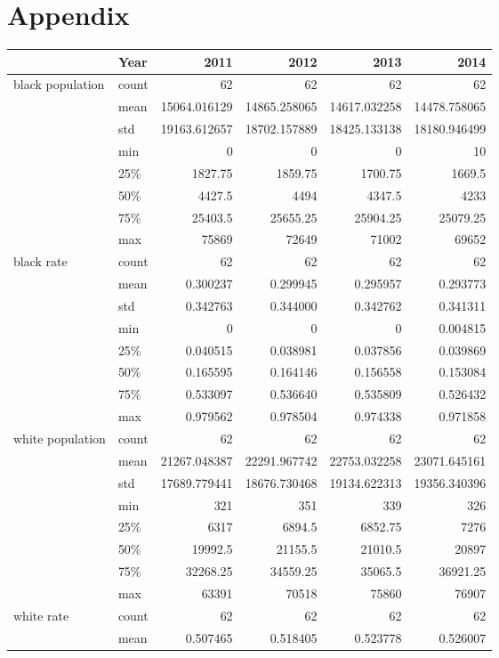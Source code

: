 \documentclass{article}
\begin{document}
\section{Appendix}
\begin{tabular}{llrrrr}
\toprule
           & Year &         2011 &         2012 &         2013 &         2014 \\
\midrule
 black population & count &      62 &      62 &      62 &      62 \\           & mean &   15064.016129 &   14865.258065 &   14617.032258 &   14478.758065 \\           & std &   19163.612657 &   18702.157889 &   18425.133138 &   18180.946499 \\           & min &       0 &       0 &       0 &      10 \\           & 25\% &    1827.75 &    1859.75 &    1700.75 &    1669.5 \\           & 50\% &    4427.5 &    4494 &    4347.5 &    4233 \\           & 75\% &   25403.5 &   25655.25 &   25904.25 &   25079.25 \\           & max &   75869 &   72649 &   71002 &   69652 \\black rate & count &      62 &      62 &      62 &      62 \\           & mean &       0.300237 &       0.299945 &       0.295957 &       0.293773 \\           & std &       0.342763 &       0.344000 &       0.342762 &       0.341311 \\           & min &       0 &       0 &       0 &       0.004815 \\           & 25\% &       0.040515 &       0.038981 &       0.037856 &       0.039869 \\           & 50\% &       0.165595 &       0.164146 &       0.156558 &       0.153084 \\           & 75\% &       0.533097 &       0.536640 &       0.535809 &       0.526432 \\           & max &       0.979562 &       0.978504 &       0.974338 &       0.971858 \\white population & count &      62 &      62 &      62 &      62 \\           & mean &   21267.048387 &   22291.967742 &   22753.032258 &   23071.645161 \\           & std &   17689.779441 &   18676.730468 &   19134.622313 &   19356.340396 \\           & min &     321 &     351 &     339 &     326 \\           & 25\% &    6317 &    6894.5 &    6852.75 &    7276 \\           & 50\% &   19992.5 &   21155.5 &   21010.5 &   20897 \\           & 75\% &   32268.25 &   34559.25 &   35065.5 &   36921.25 \\           & max &   63391 &   70518 &   75860 &   76907 \\white rate & count &      62 &      62 &      62 &      62 \\           & mean &       0.507465 &       0.518405 &       0.523778 &       0.526007 
\end{tabular}
\end{document}

